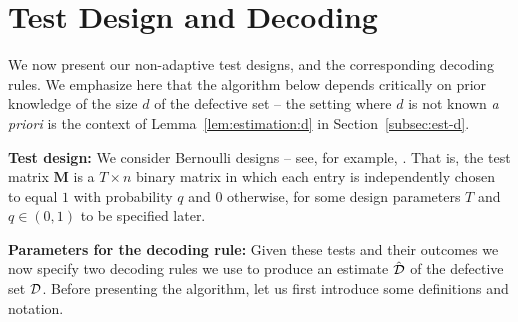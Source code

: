 \documentclass[onecolumn,letterpaper]{IEEEtran}
\newcommand{\cM}{{\boldsymbol{M}}}
\newcommand{\nT}{{T}}
\newcommand{\cp}{{q}}
\newcommand{\xw}[1]{\textcolor{cyan}{#1}}
\begin{document}


\section{Test Design and Decoding}
\label{sec:test_design}
We now present our non-adaptive test designs, and the corresponding decoding rules. We emphasize here that the algorithm below depends critically on {prior} knowledge of the size $d$ of the defective set -- the setting where $d$ is not known {\it a priori } is the context of Lemma~\ref{lem:estimation:d} in  Section~\ref{subsec:est-d}. %

{\bf Test design:} We consider Bernoulli designs -- see, for example, \cite{AtiaS12,ScarlettC16,ScarlettC17,Aldridge17,Monograph19}. That is, the test matrix $\cM$ is a $\nT \times n$ binary matrix in which each entry is independently chosen to equal $1$ with probability $\cp$ and $0$ otherwise, for some design parameters $T$ and $\cp\in (0,1)$ to be specified later.


{\bf Parameters for the decoding rule:}
Given these tests and their outcomes we now specify two decoding rules we use to produce an estimate $\hat{{\cal D}}$ of the defective set ${\cal D}$. Before presenting the algorithm, let us first introduce some definitions and notation.
\end{document}
